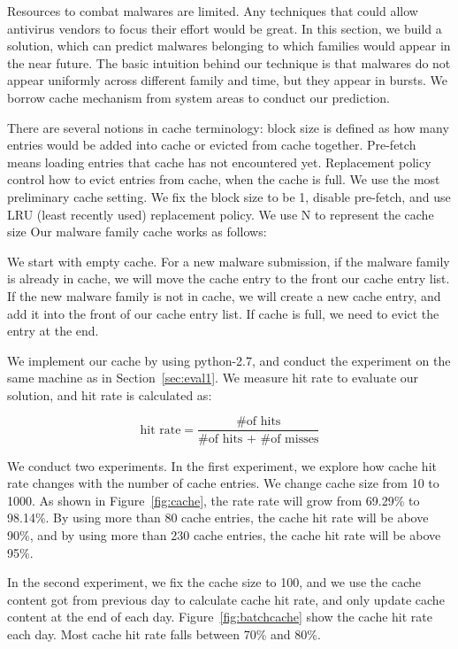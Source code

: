 Resources to combat malwares are limited. 
Any techniques that could allow antivirus vendors to focus their effort would be great. 
In this section, we build a solution, which can predict malwares belonging to which families would appear in the near future. 
The basic intuition behind our technique is that malwares do not appear uniformly across different family and time, but they appear in bursts.
We borrow cache mechanism from system areas to conduct our prediction. 

There are several notions in cache terminology: 
block size is defined as how many entries would be added into cache or evicted from cache together.
Pre-fetch means loading entries that cache has not encountered yet. 
Replacement policy control how to evict entries from cache, when the cache is full. 
We use the most preliminary cache setting. We fix the block size to be 1, disable pre-fetch, 
and use LRU (least recently used) replacement policy. We use N to represent the cache size
Our malware family cache works as follows:  

We start with empty cache. 
For a new malware submission, if the malware family is already in cache, we will move the cache entry to the front our cache entry list. 
If the new malware family is not in cache, 
we will create a new cache entry, and add it into the front of our cache entry list. 
If cache is full, we need to evict the entry at the end. 



We implement our cache by using python-2.7, 
and conduct the experiment on the same machine as in Section~\ref{sec:eval1}. 
We measure hit rate to evaluate our solution, and hit rate is calculated as: 

$$ \mbox{hit rate} = \dfrac{\mbox{\# of hits}}{\mbox{\# of hits + \# of misses}}$$

We conduct two experiments. In the first experiment, 
we explore how cache hit rate changes with the number of cache entries. 
We change cache size from 10 to 1000. As shown in Figure~\ref{fig:cache}, 
the rate rate will grow from 69.29\% to 98.14\%. 
By using more than 80 cache entries, the cache hit rate will be above 90\%, 
and by using more than 230 cache entries, the cache hit rate will be above 95\%. 

In the second experiment, we fix the cache size to 100, 
and we use the cache content got from previous day to calculate cache hit rate, 
and only update cache content at the end of each day. Figure~\ref{fig:batchcache} show the cache hit rate each day. 
Most cache hit rate falls between 70\% and 80\%.  

